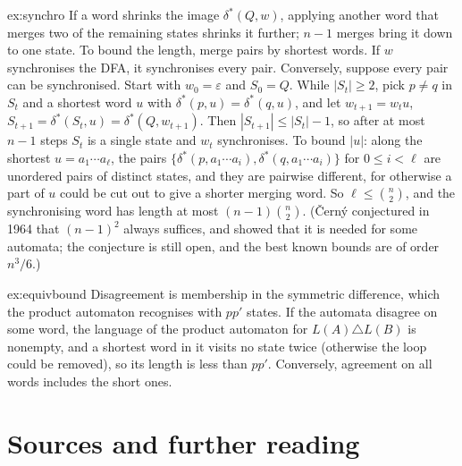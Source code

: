 \begin{solution}{ex:synchro}
\idea If a word shrinks the image $\delta^*(Q,w)$, applying another word that merges two of the remaining states shrinks it further; $n-1$ merges bring it down to one state. To bound the length, merge pairs by shortest words.
\writeup If $w$ synchronises the DFA, it synchronises every pair. Conversely, suppose every pair can be synchronised. Start with $w_0=\varepsilon$ and $S_0=Q$. While $|S_t|\ge2$, pick $p\ne q$ in $S_t$ and a shortest word $u$ with $\delta^*(p,u)=\delta^*(q,u)$, and let $w_{t+1}=w_tu$, $S_{t+1}=\delta^*(S_t,u)=\delta^*(Q,w_{t+1})$. Then $|S_{t+1}|\le|S_t|-1$, so after at most $n-1$ steps $S_t$ is a single state and $w_t$ synchronises. To bound $|u|$: along the shortest $u=a_1\cdots a_\ell$, the pairs $\{\delta^*(p,a_1\cdots a_i),\delta^*(q,a_1\cdots a_i)\}$ for $0\le i<\ell$ are unordered pairs of distinct states, and they are pairwise different, for otherwise a part of $u$ could be cut out to give a shorter merging word. So $\ell\le\binom n2$, and the synchronising word has length at most $(n-1)\binom n2$. (Černý conjectured in 1964 that $(n-1)^2$ always suffices, and showed that it is needed for some automata; the conjecture is still open, and the best known bounds are of order $n^3/6$.)
\end{solution}

\begin{solution}{ex:equivbound}
\idea Disagreement is membership in the symmetric difference, which the product automaton recognises with $pp'$ states.
\writeup If the automata disagree on some word, the language of the product automaton for $L(A)\triangle L(B)$ is nonempty, and a shortest word in it visits no state twice (otherwise the loop could be removed), so its length is less than $pp'$. Conversely, agreement on all words includes the short ones.
\end{solution}

\section*{Sources and further reading}

